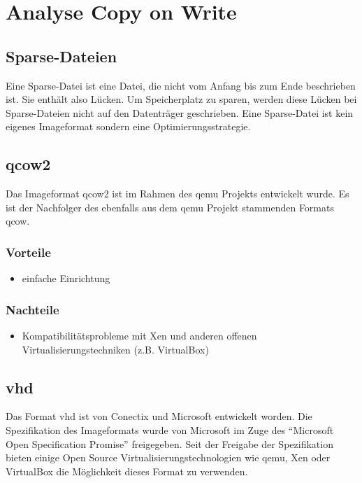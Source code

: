 \chapter{Analyse Copy on Write}
\section{Sparse-Dateien}
Eine Sparse-Datei ist eine Datei, die nicht vom Anfang bis zum Ende beschrieben ist. Sie enthält also Lücken. Um Speicherplatz zu sparen, werden diese Lücken bei Sparse-Dateien nicht auf den Datenträger geschrieben. Eine Sparse-Datei ist kein eigenes Imageformat sondern eine Optimierungsstrategie. \cite{sparse}


\section{qcow2}
Das Imageformat qcow2 ist im Rahmen des qemu Projekts entwickelt wurde. Es ist der Nachfolger des ebenfalls aus dem qemu Projekt stammenden Formats qcow. \cite{qcowmarkmc} \cite{qemuwiki}

\subsection{Vorteile}
\begin{itemize}
 \item einfache Einrichtung
\end{itemize}

\subsection{Nachteile}
\begin{itemize}
 \item Kompatibilitätsprobleme mit Xen und anderen offenen Virtualisierungstechniken (z.B. VirtualBox)
\end{itemize}

\section{vhd}
Das Format vhd ist von Conectix und Microsoft entwickelt worden. Die Spezifikation des Imageformats wurde von Microsoft im Zuge des ``Microsoft Open Specification Promise'' freigegeben. Seit der Freigabe der Spezifikation bieten einige Open Source Virtualisierungstechnologien wie qemu, Xen oder VirtualBox die Möglichkeit dieses Format zu verwenden. \cite{msosp} \cite{vhdspec} %

